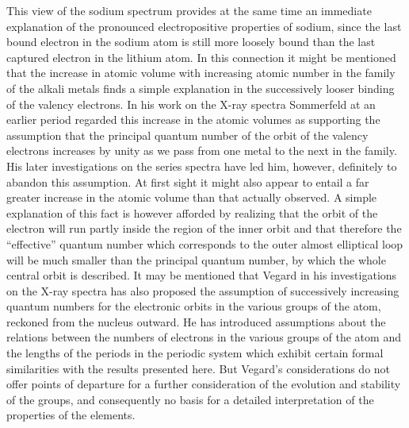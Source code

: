 This view of the sodium spectrum provides at the same time an
immediate explanation of the pronounced electropositive properties
of sodium, since the last bound electron in the sodium atom is still
more loosely bound than the last captured electron in the lithium
atom. In this connection it might be mentioned that the increase
in atomic volume with increasing atomic number in the family of
the alkali metals finds a simple explanation in the successively
looser binding of the valency electrons. In his work on the X-ray
spectra Sommerfeld at an earlier period regarded this increase in
the atomic volumes as supporting the assumption that the principal
quantum number of the orbit of the valency electrons increases by
unity as we pass from one metal to the next in the family. His
later investigations on the series spectra have led him, however,
definitely to abandon this assumption. At first sight it might also
appear to entail a far greater increase in the atomic volume than
that actually observed. A simple explanation of this fact is however
afforded by realizing that the orbit of the electron will run
partly inside the region of the inner orbit and that therefore the
``effective'' quantum number which corresponds to the outer almost
elliptical loop will be much smaller than the principal quantum
number, by which the whole central orbit is described. It may
be mentioned that Vegard in his investigations on the X-ray spectra
has also proposed the assumption of successively increasing quantum
numbers for the electronic orbits in the various groups of the atom,
reckoned from the nucleus outward. He has introduced assumptions
about the relations between the numbers of electrons in the various
groups of the atom and the lengths of the periods in the periodic
system which exhibit certain formal similarities with the results
presented here. But Vegard's considerations do not offer points of
departure for a further consideration of the evolution and stability
of the groups, and consequently no basis for a detailed interpretation
of the properties of the elements.


